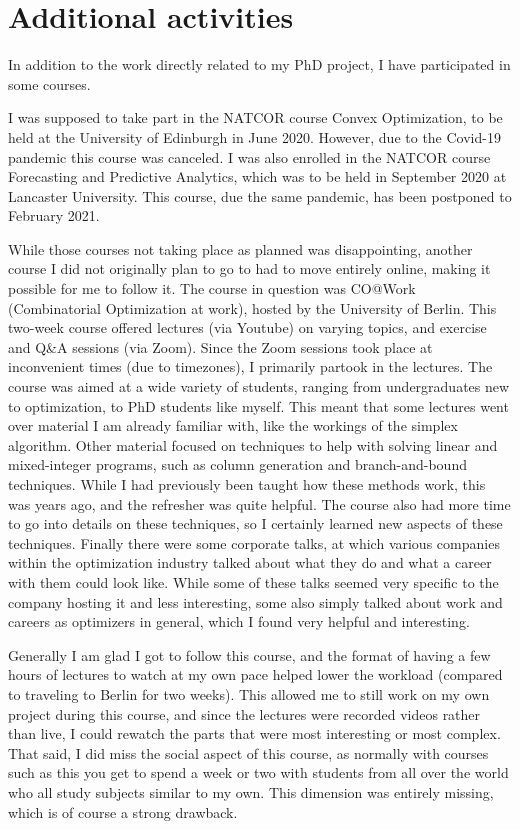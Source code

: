 \documentclass[a4paper,12pt]{article}
\begin{document}
\pagebreak

\section{Additional activities} \label{s:addit} %
In addition to the work directly related to my PhD project, I have participated in some courses. 

I was supposed to take part in the NATCOR course Convex Optimization, to be held at the University of Edinburgh in June 2020. However, due to the Covid-19 pandemic this course was canceled. I was also enrolled in the NATCOR course Forecasting and Predictive Analytics, which was to be held in September 2020 at Lancaster University. This course, due the same pandemic, has been postponed to February 2021. 

\bigskip

While those courses not taking place as planned was disappointing, another course I did not originally plan to go to had to move entirely online, making it possible for me to follow it. The course in question was CO@Work (Combinatorial Optimization at work), hosted by the University of Berlin. This two-week course offered lectures (via Youtube) on varying topics, and exercise and Q\&A sessions (via Zoom). Since the Zoom sessions took place at inconvenient times (due to timezones), I primarily partook in the lectures. The course was aimed at a wide variety of students, ranging from undergraduates new to optimization, to PhD students like myself. This meant that some lectures went over material I am already familiar with, like the workings of the simplex algorithm. Other material focused on techniques to help with solving linear and mixed-integer programs, such as column generation and branch-and-bound techniques. While I had previously been taught how these methods work, this was years ago, and the refresher was quite helpful. The course also had more time to go into details on these techniques, so I certainly learned new aspects of these techniques. Finally there were some corporate talks, at which various companies within the optimization industry talked about what they do and what a career with them could look like. While some of these talks seemed very specific to the company hosting it and less interesting, some also simply talked about work and careers as optimizers in general, which I found very helpful and interesting. 

Generally I am glad I got to follow this course, and the format of having a few hours of lectures to watch at my own pace helped lower the workload (compared to traveling to Berlin for two weeks). This allowed me to still work on my own project during this course, and since the lectures were recorded videos rather than live, I could rewatch the parts that were most interesting or most complex. That said, I did miss the social aspect of this course, as normally with courses such as this you get to spend a week or two with students from all over the world who all study subjects similar to my own. This dimension was entirely missing, which is of course a strong drawback. 
\end{document}
